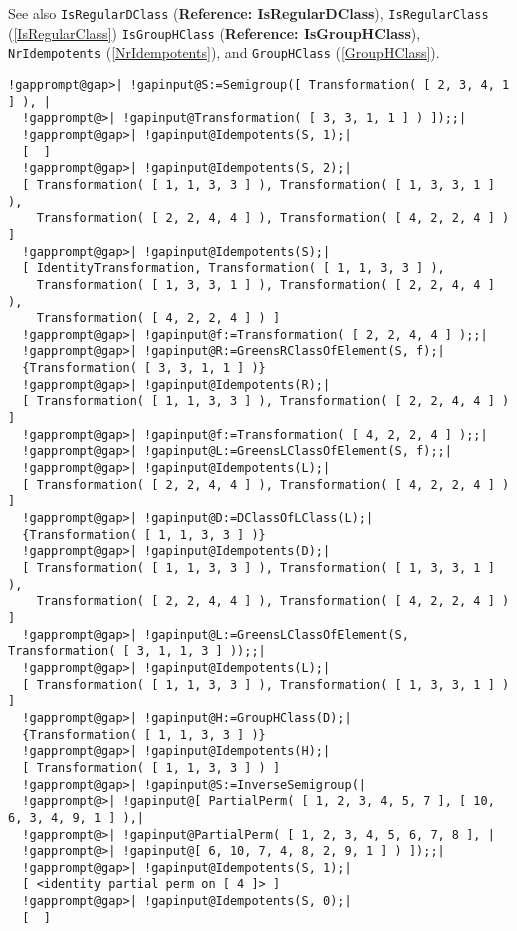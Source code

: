 \documentclass[a4paper,11pt]{report}
\begin{document}
{{{ See also \texttt{IsRegularDClass} (\textbf{Reference: IsRegularDClass}), \texttt{IsRegularClass} (\ref{IsRegularClass}) \texttt{IsGroupHClass} (\textbf{Reference: IsGroupHClass}), \texttt{NrIdempotents} (\ref{NrIdempotents}), and \texttt{GroupHClass} (\ref{GroupHClass}). 
\begin{Verbatim}[commandchars=!@|,fontsize=\small,frame=single,label=Example]
  !gapprompt@gap>| !gapinput@S:=Semigroup([ Transformation( [ 2, 3, 4, 1 ] ), |
  !gapprompt@>| !gapinput@Transformation( [ 3, 3, 1, 1 ] ) ]);;|
  !gapprompt@gap>| !gapinput@Idempotents(S, 1);|
  [  ]
  !gapprompt@gap>| !gapinput@Idempotents(S, 2);|
  [ Transformation( [ 1, 1, 3, 3 ] ), Transformation( [ 1, 3, 3, 1 ] ), 
    Transformation( [ 2, 2, 4, 4 ] ), Transformation( [ 4, 2, 2, 4 ] ) ]
  !gapprompt@gap>| !gapinput@Idempotents(S);|
  [ IdentityTransformation, Transformation( [ 1, 1, 3, 3 ] ), 
    Transformation( [ 1, 3, 3, 1 ] ), Transformation( [ 2, 2, 4, 4 ] ), 
    Transformation( [ 4, 2, 2, 4 ] ) ]
  !gapprompt@gap>| !gapinput@f:=Transformation( [ 2, 2, 4, 4 ] );;|
  !gapprompt@gap>| !gapinput@R:=GreensRClassOfElement(S, f);|
  {Transformation( [ 3, 3, 1, 1 ] )}
  !gapprompt@gap>| !gapinput@Idempotents(R);|
  [ Transformation( [ 1, 1, 3, 3 ] ), Transformation( [ 2, 2, 4, 4 ] ) ]
  !gapprompt@gap>| !gapinput@f:=Transformation( [ 4, 2, 2, 4 ] );;|
  !gapprompt@gap>| !gapinput@L:=GreensLClassOfElement(S, f);;|
  !gapprompt@gap>| !gapinput@Idempotents(L);|
  [ Transformation( [ 2, 2, 4, 4 ] ), Transformation( [ 4, 2, 2, 4 ] ) ]
  !gapprompt@gap>| !gapinput@D:=DClassOfLClass(L);|
  {Transformation( [ 1, 1, 3, 3 ] )}
  !gapprompt@gap>| !gapinput@Idempotents(D);|
  [ Transformation( [ 1, 1, 3, 3 ] ), Transformation( [ 1, 3, 3, 1 ] ), 
    Transformation( [ 2, 2, 4, 4 ] ), Transformation( [ 4, 2, 2, 4 ] ) ]
  !gapprompt@gap>| !gapinput@L:=GreensLClassOfElement(S, Transformation( [ 3, 1, 1, 3 ] ));;|
  !gapprompt@gap>| !gapinput@Idempotents(L);|
  [ Transformation( [ 1, 1, 3, 3 ] ), Transformation( [ 1, 3, 3, 1 ] ) ]
  !gapprompt@gap>| !gapinput@H:=GroupHClass(D);|
  {Transformation( [ 1, 1, 3, 3 ] )}
  !gapprompt@gap>| !gapinput@Idempotents(H);|
  [ Transformation( [ 1, 1, 3, 3 ] ) ]
  !gapprompt@gap>| !gapinput@S:=InverseSemigroup(|
  !gapprompt@>| !gapinput@[ PartialPerm( [ 1, 2, 3, 4, 5, 7 ], [ 10, 6, 3, 4, 9, 1 ] ),|
  !gapprompt@>| !gapinput@PartialPerm( [ 1, 2, 3, 4, 5, 6, 7, 8 ], |
  !gapprompt@>| !gapinput@[ 6, 10, 7, 4, 8, 2, 9, 1 ] ) ]);;|
  !gapprompt@gap>| !gapinput@Idempotents(S, 1);|
  [ <identity partial perm on [ 4 ]> ]
  !gapprompt@gap>| !gapinput@Idempotents(S, 0);|
  [  ]
\end{Verbatim}
 }

}}
\end{document}
